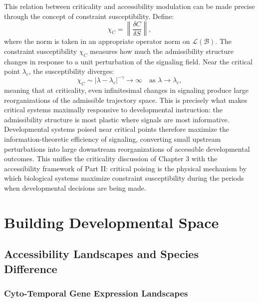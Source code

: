 \documentclass[12pt, a4paper, openany]{book}
\theoremstyle{definition}
\theoremstyle{remark}
\begin{document}
This relation between criticality and accessibility modulation can be made precise through the concept of constraint susceptibility. Define:
\begin{equation}
\chi_C = \left\| \frac{\delta C}{\delta S} \right\|,
\end{equation}
where the norm is taken in an appropriate operator norm on $\mathcal{L}(\mathcal{B})$. The constraint susceptibility $\chi_C$ measures how much the admissibility structure changes in response to a unit perturbation of the signaling field. Near the critical point $\lambda_c$, the susceptibility diverges:
\begin{equation}
\chi_C \sim |\lambda - \lambda_c|^{-\gamma} \to \infty \quad \text{as } \lambda \to \lambda_c,
\end{equation}
meaning that at criticality, even infinitesimal changes in signaling produce large reorganizations of the admissible trajectory space. This is precisely what makes critical systems maximally responsive to developmental instruction: the admissibility structure is most plastic where signals are most informative. Developmental systems poised near critical points therefore maximize the information-theoretic efficiency of signaling, converting small upstream perturbations into large downstream reorganizations of accessible developmental outcomes. This unifies the criticality discussion of Chapter 3 with the accessibility framework of Part II: critical poising is the physical mechanism by which biological systems maximize constraint susceptibility during the periods when developmental decisions are being made.


\part{Building Developmental Space}


\chapter{Accessibility Landscapes and Species Difference}

\section{Cyto-Temporal Gene Expression Landscapes}
\end{document}
